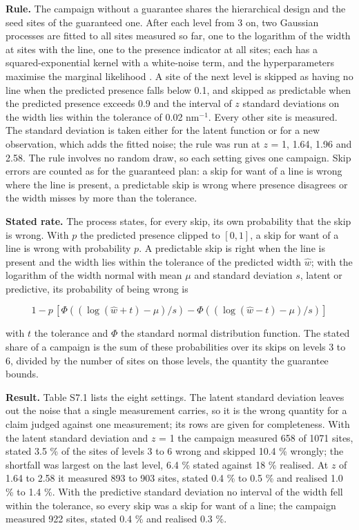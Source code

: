 \documentclass{iopjournal}
\begin{document}
\textbf{Rule.} The campaign without a guarantee shares the hierarchical design and the seed sites of the guaranteed one. After each level from 3 on, two Gaussian processes are fitted to all sites measured so far, one to the logarithm of the width at sites with the line, one to the presence indicator at all sites; each has a squared-exponential kernel with a white-noise term, and the hyperparameters maximise the marginal likelihood \cite{RasmussenWilliams2006}. A site of the next level is skipped as having no line when the predicted presence falls below 0.1, and skipped as predictable when the predicted presence exceeds 0.9 and the interval of \(z\) standard deviations on the width lies within the tolerance of 0.02 nm\ensuremath{^{-1}}. Every other site is measured. The standard deviation is taken either for the latent function or for a new observation, which adds the fitted noise; the rule was run at \(z\) = 1, 1.64, 1.96 and 2.58. The rule involves no random draw, so each setting gives one campaign. Skip errors are counted as for the guaranteed plan: a skip for want of a line is wrong where the line is present, a predictable skip is wrong where presence disagrees or the width misses by more than the tolerance.

\textbf{Stated rate.} The process states, for every skip, its own probability that the skip is wrong. With \(p\) the predicted presence clipped to \([0, 1]\), a skip for want of a line is wrong with probability \(p\). A predictable skip is right when the line is present and the width lies within the tolerance of the predicted width \(\hat w\); with the logarithm of the width normal with mean \(\mu\) and standard deviation \(s\), latent or predictive, its probability of being wrong is

\[
1 - p \, [\Phi((\log(\hat w + t) - \mu)/s) - \Phi((\log(\hat w - t) - \mu)/s)]
\]

with \(t\) the tolerance and \(\Phi\) the standard normal distribution function. The stated share of a campaign is the sum of these probabilities over its skips on levels 3 to 6, divided by the number of sites on those levels, the quantity the guarantee bounds.

\textbf{Result.} Table S7.1 lists the eight settings. The latent standard deviation leaves out the noise that a single measurement carries, so it is the wrong quantity for a claim judged against one measurement; its rows are given for completeness. With the latent standard deviation and \(z\) = 1 the campaign measured 658 of 1071 sites, stated 3.5 \% of the sites of levels 3 to 6 wrong and skipped 10.4 \% wrongly; the shortfall was largest on the last level, 6.4 \% stated against 18 \% realised. At \(z\) of 1.64 to 2.58 it measured 893 to 903 sites, stated 0.4 \% to 0.5 \% and realised 1.0 \% to 1.4 \%. With the predictive standard deviation no interval of the width fell within the tolerance, so every skip was a skip for want of a line; the campaign measured 922 sites, stated 0.4 \% and realised 0.3 \%.
\end{document}
